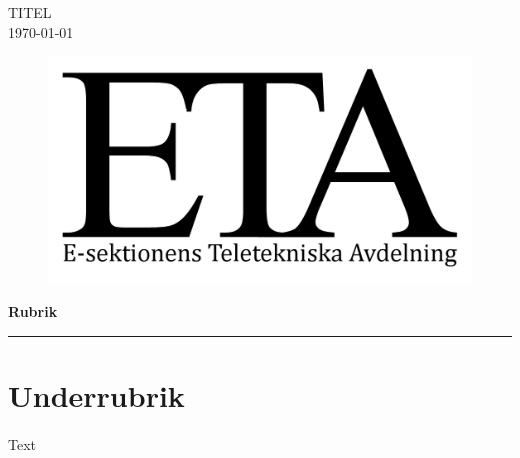 \documentclass[a4paper, 12pt]{article}
\begin{document}
\titlespacing{\subsection}{0pt}{\parskip}{-\parskip}
\titlespacing{\subsubsection}{0pt}{\parskip}{-\parskip}

\flushright
TITEL\\
\today

\flushleft

\begin{figure}[h]
    \includegraphics[scale = 2]{ETA-logga.png}
\end{figure}
{\LARGE \textbf{Rubrik}}         %
\newline
\noindent\rule{\textwidth}{1pt}

\section*{Underrubrik}                     %
\paragraph{}
Text

\end{document}

